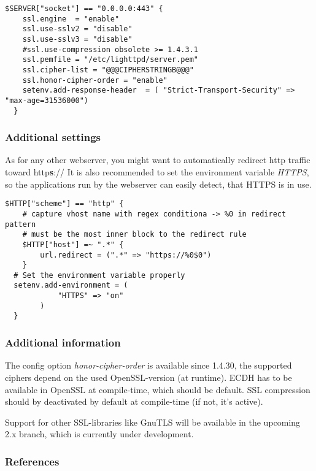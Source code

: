 
\begin{lstlisting}[breaklines]
  $SERVER["socket"] == "0.0.0.0:443" {
    ssl.engine  = "enable"
    ssl.use-sslv2 = "disable"
    ssl.use-sslv3 = "disable"
    #ssl.use-compression obsolete >= 1.4.3.1
    ssl.pemfile = "/etc/lighttpd/server.pem"
    ssl.cipher-list = "@@@CIPHERSTRINGB@@@"
    ssl.honor-cipher-order = "enable"
    setenv.add-response-header  = ( "Strict-Transport-Security" => "max-age=31536000")
  }
\end{lstlisting}


\subsubsection{Additional settings}

As for any other webserver, you might want to automatically redirect http
traffic toward http\textbf{s}:// It is also recommended to set the environment variable
\emph{HTTPS}, so the applications run by the webserver can easily detect, that
HTTPS is in use.



\begin{lstlisting}[breaklines]
  $HTTP["scheme"] == "http" {
    # capture vhost name with regex conditiona -> %0 in redirect pattern
    # must be the most inner block to the redirect rule
    $HTTP["host"] =~ ".*" {
        url.redirect = (".*" => "https://%0$0")
    }
  # Set the environment variable properly
  setenv.add-environment = (
            "HTTPS" => "on"
        )
  }
\end{lstlisting}


\subsubsection{Additional information} 
The config option \emph{honor-cipher-order} is available since 1.4.30, the
supported ciphers depend on the used OpenSSL-version (at runtime). ECDH has to
be available in OpenSSL at compile-time, which should be default. SSL
compression should by deactivated by default at compile-time (if not, it's
active).

Support for other SSL-libraries like GnuTLS will be available in the upcoming
2.x branch, which is currently under development.


\subsubsection{References} 

